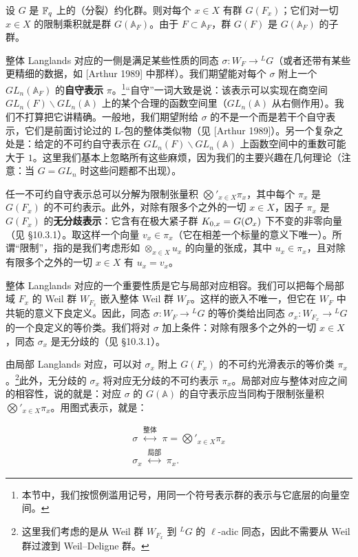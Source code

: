 设 $G$ 是 $\mathbb{F}_q$ 上的（分裂）约化群。则对每个 $x\in X$ 有群 $G(F_x)$；它们对一切 $x\in X$ 的限制乘积就是群 $G(\mathbb{A}_F)$。由于 $F\subset\mathbb{A}_F$，群 $G(F)$ 是 $G(\mathbb{A}_F)$ 的子群。

整体 Langlands 对应的一侧是满足某些性质的同态 $\sigma:W_F\to{}^L G$（或者还带有某些更精细的数据，如 [Arthur 1989] 中那样）。我们期望能对每个 $\sigma$ 附上一个 $GL_n(\mathbb{A}_F)$ 的\textbf{自守表示} $\pi$。\footnote{本节中，我们按惯例滥用记号，用同一个符号表示群的表示与它底层的向量空间。}“自守”一词大致是说：该表示可以实现在商空间 $GL_n(F)\backslash GL_n(\mathbb{A})$ 上的某个合理的函数空间里（$GL_n(\mathbb{A})$ 从右侧作用）。我们不打算把它讲精确。一般地，我们期望附给 $\sigma$ 的不是一个而是若干个自守表示，它们是前面讨论过的 L-包的整体类似物（见 [Arthur 1989]）。另一个复杂之处是：给定的不可约自守表示在 $GL_n(F)\backslash GL_n(\mathbb{A})$ 上函数空间中的重数可能大于 $1$。这里我们基本上忽略所有这些麻烦，因为我们的主要兴趣在几何理论（注意：当 $G=GL_n$ 时这些问题都不出现）。

任一不可约自守表示总可以分解为限制张量积 $\bigotimes'_{x\in X}\pi_x$，其中每个 $\pi_x$ 是 $G(F_x)$ 的不可约表示。此外，对除有限多个之外的一切 $x\in X$，因子 $\pi_x$ 是 $G(F_x)$ 的\textbf{无分歧表示}：它含有在极大紧子群 $K_{0,x}=G(\mathcal{O}_x)$ 下不变的非零向量（见 §10.3.1）。取这样一个向量 $v_x\in\pi_x$（它在相差一个标量的意义下唯一）。所谓“限制”，指的是我们考虑形如 $\otimes_{x\in X}u_x$ 的向量的张成，其中 $u_x\in\pi_x$，且对除有限多个之外的一切 $x\in X$ 有 $u_x=v_x$。

整体 Langlands 对应的一个重要性质是它与局部对应相容。我们可以把每个局部域 $F_x$ 的 Weil 群 $W_{F_x}$ 嵌入整体 Weil 群 $W_F$。这样的嵌入不唯一，但它在 $W_F$ 中共轭的意义下良定义。因此，同态 $\sigma:W_F\to{}^L G$ 的等价类给出同态 $\sigma_x:W_{F_x}\to{}^L G$ 的一个良定义的等价类。我们将对 $\sigma$ 加上条件：对除有限多个之外的一切 $x\in X$，同态 $\sigma_x$ 是无分歧的（见 §10.3.1）。

由局部 Langlands 对应，可以对 $\sigma_x$ 附上 $G(F_x)$ 的不可约光滑表示的等价类 $\pi_x$。\footnote{这里我们考虑的是从 Weil 群 $W_{F_x}$ 到 ${}^L G$ 的 $\ell$-adic 同态，因此不需要从 Weil 群过渡到 Weil--Deligne 群。}此外，无分歧的 $\sigma_x$ 将对应无分歧的不可约表示 $\pi_x$。局部对应与整体对应之间的相容性，说的就是：对应 $\sigma$ 的 $G(\mathbb{A})$ 的自守表示应当同构于限制张量积 $\bigotimes'_{x\in X}\pi_x$。用图式表示，就是：

\[
\begin{array}{c}
\sigma \;\overset{\text{整体}}{\longleftrightarrow}\;
\pi=\bigotimes{}'_{x\in X}\pi_x\\[5pt]
\sigma_x \;\overset{\text{局部}}{\longleftrightarrow}\;
\pi_x .
\end{array}
\]

